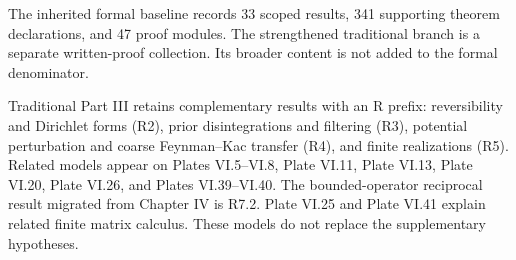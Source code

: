 The inherited formal baseline records 33 scoped results, 341 supporting theorem declarations, and 47 proof modules. The strengthened traditional branch is a separate written-proof collection. Its broader content is not added to the formal denominator.

Traditional Part III retains complementary results with an R prefix: reversibility and Dirichlet forms (R2), prior disintegrations and filtering (R3), potential perturbation and coarse Feynman--Kac transfer (R4), and finite realizations (R5). Related models appear on Plates VI.5--VI.8, Plate VI.11, Plate VI.13, Plate VI.20, Plate VI.26, and Plates VI.39--VI.40. The bounded-operator reciprocal result migrated from Chapter IV is R7.2. Plate VI.25 and Plate VI.41 explain related finite matrix calculus. These models do not replace the supplementary hypotheses.
